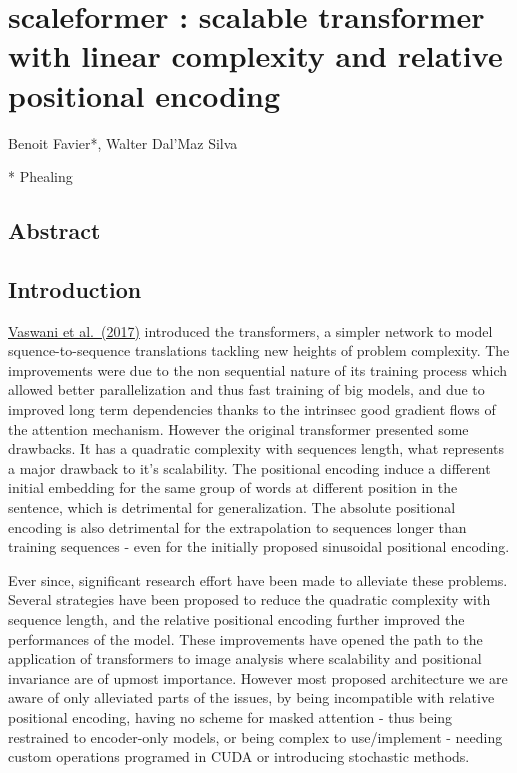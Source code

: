 \hypertarget{scaleformer-scalable-transformer-with-linear-complexity-and-relative-positional-encoding}{%
\section{scaleformer : scalable transformer with linear complexity and
relative positional
encoding}\label{scaleformer-scalable-transformer-with-linear-complexity-and-relative-positional-encoding}}

Benoit Favier*, Walter Dal'Maz Silva

* Phealing

\hypertarget{abstract}{%
\subsection{Abstract}\label{abstract}}

\hypertarget{introduction}{%
\subsection{Introduction}\label{introduction}}

\href{https://arxiv.org/abs/1706.03762}{Vaswani et al.~(2017)}
introduced the transformers, a simpler network to model
squence-to-sequence translations tackling new heights of problem
complexity. The improvements were due to the non sequential nature of
its training process which allowed better parallelization and thus fast
training of big models, and due to improved long term dependencies
thanks to the intrinsec good gradient flows of the attention mechanism.
However the original transformer presented some drawbacks. It has a
quadratic complexity with sequences length, what represents a major
drawback to it's scalability. The positional encoding induce a different
initial embedding for the same group of words at different position in
the sentence, which is detrimental for generalization. The absolute
positional encoding is also detrimental for the extrapolation to
sequences longer than training sequences - even for the initially
proposed sinusoidal positional encoding.

Ever since, significant research effort have been made to alleviate
these problems. Several strategies have been proposed to reduce the
quadratic complexity with sequence length, and the relative positional
encoding further improved the performances of the model. These
improvements have opened the path to the application of transformers to
image analysis where scalability and positional invariance are of upmost
importance. However most proposed architecture we are aware of only
alleviated parts of the issues, by being incompatible with relative
positional encoding, having no scheme for masked attention - thus being
restrained to encoder-only models, or being complex to use/implement -
needing custom operations programed in CUDA or introducing stochastic
methods.

